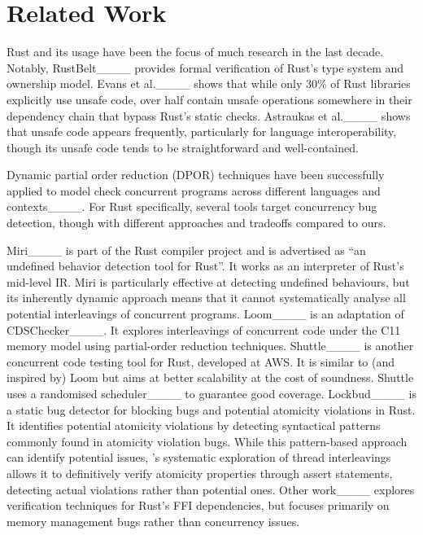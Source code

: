 \section{Related Work}
\label{sec:related-work}
Rust and its usage have been the focus of much research in
the last decade.
Notably, RustBelt____ provides formal verification of Rust's
type system and ownership model.
Evans et al.____ shows that while only 30\% of Rust
libraries explicitly use unsafe code, over half contain unsafe
operations somewhere in their dependency chain that bypass Rust's
static checks.
Astraukas et al.____ shows that unsafe code
appears frequently, particularly for language interoperability, though
its unsafe code tends to be straightforward and well-contained.


Dynamic partial order reduction (DPOR) techniques have been
successfully applied to model check concurrent programs across
different languages and
contexts____. For Rust
specifically, several tools target concurrency bug detection, though
with different approaches and tradeoffs compared to ours.

Miri____ is part of the Rust compiler project and is
advertised as ``an undefined behavior detection tool for Rust''. It
works as an interpreter of Rust's mid-level IR.
Miri is particularly effective at detecting undefined behaviours, but
its inherently dynamic approach means that it cannot systematically
analyse all potential interleavings of concurrent programs.
Loom____ is an adaptation of CDSChecker____. It
explores interleavings of concurrent code under
the C11 memory model using partial-order reduction techniques.
Shuttle____ is another concurrent code testing tool for
Rust, developed at AWS. It is similar to (and inspired by) Loom but
aims at better scalability at the cost of soundness. Shuttle uses a
randomised scheduler____ to guarantee good
coverage.
Lockbud____ is a static bug detector for
blocking bugs and potential atomicity violations in Rust. It
identifies potential atomicity violations by detecting syntactical
patterns commonly found in atomicity violation bugs. While this
pattern-based approach can identify potential issues, \rustmc's
systematic exploration of thread interleavings allows it to
definitively verify atomicity properties through assert statements,
detecting actual violations rather than potential ones.
Other work____ explores 
verification techniques for Rust's FFI dependencies, but 
focuses primarily on memory management bugs rather than concurrency
issues.

